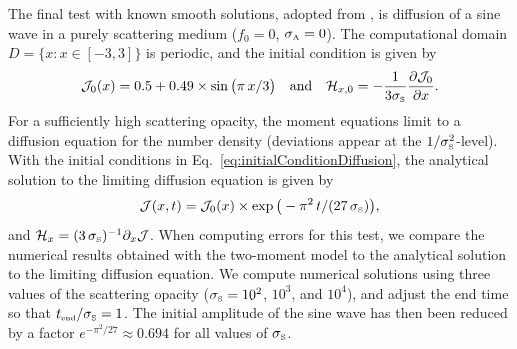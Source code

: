 The final test with known smooth solutions, adopted from \cite{radice_etal_2013}, is diffusion of a sine wave in a purely scattering medium ($f_{0}=0$, $\sigma_{\mbox{\tiny A}}=0$).  
The computational domain $D=\{x:x\in[-3,3]\}$ is periodic, and the initial condition is given by
\begin{equation}
  \mathcal{J}_{0}(x)=0.5+0.49\times\sin\big(\pi\,x/3\big)
  \quad\text{and}\quad
  \mathcal{H}_{x,0}
  =-\frac{1}{3\sigma_{\mbox{\tiny S}}}\frac{\partial \mathcal{J}_{0}}{\partial x}.  
  \label{eq:initialConditionDiffusion}
\end{equation}
For a sufficiently high scattering opacity, the moment equations limit to a diffusion equation for the number density (deviations appear at the $1/\sigma_{\mbox{\tiny S}}^{2}$-level).  
With the initial conditions in Eq.~\eqref{eq:initialConditionDiffusion}, the analytical solution to the limiting diffusion equation is given by
\begin{equation}
  \mathcal{J}(x,t)=\mathcal{J}_{0}(x)\times\exp\big(-\pi^{2}\,t/(27\,\sigma_{\mbox{\tiny S}})\big),
\end{equation}
and $\mathcal{H}_{x}=(3\,\sigma_{\mbox{\tiny S}})^{-1}\partial_{x}{\mathcal{J}}$.  
When computing errors for this test, we compare the numerical results obtained with the two-moment model to the analytical solution to the limiting diffusion equation.  
We compute numerical solutions using three values of the scattering opacity ($\sigma_{\mbox{\tiny S}}=10^{2}$, $10^{3}$, and $10^{4}$), and adjust the end time so that $t_{\mbox{\tiny end}}/\sigma_{\mbox{\tiny S}}=1$.  
The initial amplitude of the sine wave has then been reduced by a factor $e^{-\pi^{2}/27}\approx0.694$ for all values of $\sigma_{\mbox{\tiny S}}$.  

